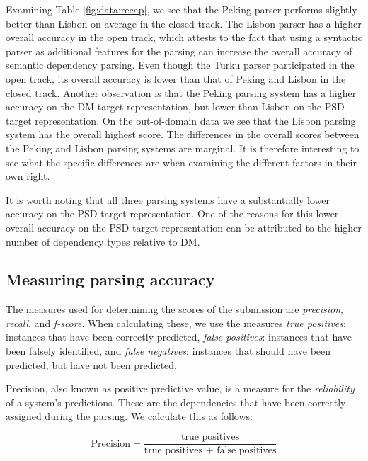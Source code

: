 Examining Table \ref{fig:data:recap}, we see that the Peking parser performs slightly better than Lisbon on average in the closed track. The Lisbon parser has a higher overall accuracy in the open track, which attests to the fact that using a syntactic parser as additional features for the parsing can increase the overall accuracy of semantic dependency parsing. Even though the Turku parser participated in the open track, its overall accuracy is lower than that of Peking and Lisbon in the closed track. Another observation is that the Peking parsing system has a higher accuracy on the DM target representation, but lower than Lisbon on the PSD target representation. On the out-of-domain data we see that the Lisbon parsing system has the overall highest score. The differences in the overall scores between the Peking and Lisbon parsing systems are marginal. It is therefore interesting to see what the specific differences are when examining the different factors in their own right.

It is worth noting that all three parsing systems have a substantially lower accuracy on the PSD target representation. One of the reasons for this lower overall accuracy on the PSD target representation can be attributed to the higher number of dependency types relative to DM.

\subsection{Measuring parsing accuracy}

The measures used for determining the scores of the submission are \textit{precision}, \textit{recall}, and \textit{f-score}. When calculating these, we use the measures \textit{true positives}: instances that have been correctly predicted, \textit{false positives}: instances that have been falsely identified, and \textit{false negatives}: instances that should have been predicted, but have not been predicted.

Precision, also known as positive predictive value, is a measure for the \textit{reliability} of a system's predictions. These are the dependencies that have been correctly assigned during the parsing. We calculate this as follows:

\begin{equation*}
    \text{Precision} = \frac{\text{true positives}}{\text{true positives + false positives}}
\end{equation*}

\vspace{1ex}

